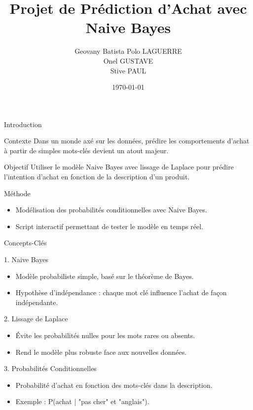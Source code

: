 \documentclass{beamer}
\title{Projet de Prédiction d'Achat avec Naive Bayes}
\author{Geovany Batista Polo LAGUERRE \\ Onel GUSTAVE \\ Stive PAUL}
\institute{Université des Antilles - M1 Mathématiques et Applications (MOAD)}
\date{\today}
\begin{document}
\frame{\titlepage}

\begin{frame}{Introduction}
    \begin{block}{Contexte}
        Dans un monde axé sur les données, prédire les comportements d'achat à partir de simples mots-clés devient un atout majeur.
    \end{block}
    
    \begin{block}{Objectif}
        Utiliser le modèle Naive Bayes avec lissage de Laplace pour prédire l'intention d'achat en fonction de la description d'un produit.
    \end{block}
    
    \begin{block}{Méthode}
        \begin{itemize}
            \item Modélisation des probabilités conditionnelles avec Naive Bayes.
            \item Script interactif permettant de tester le modèle en temps réel.
        \end{itemize}
    \end{block}
\end{frame}


\begin{frame}{Concepts-Clés}
    \begin{block}{1. Naive Bayes}
        \begin{itemize}
            \item Modèle probabiliste simple, basé sur le théorème de Bayes.
            \item Hypothèse d'indépendance : chaque mot clé influence l'achat de façon indépendante.
        \end{itemize}
    \end{block}

    \begin{block}{2. Lissage de Laplace}
        \begin{itemize}
            \item Évite les probabilités nulles pour les mots rares ou absents.
            \item Rend le modèle plus robuste face aux nouvelles données.
        \end{itemize}
    \end{block}

    \begin{block}{3. Probabilités Conditionnelles}
        \begin{itemize}
            \item Probabilité d'achat en fonction des mots-clés dans la description.
            \item Exemple : P(achat | "pas cher" et "anglais").
        \end{itemize}
    \end{block}
\end{frame}
\end{document}
